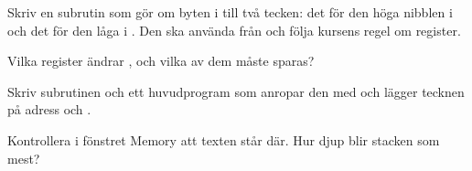 \label{c10:ex:13}
Skriv en subrutin  som gör om byten i  till två tecken: det för den
höga nibblen i  och det för den låga i . Den ska använda 
från  och följa kursens regel om register.
\begin{parts}
  \item Vilka register ändrar , och vilka av dem måste sparas?
  \item Skriv subrutinen och ett huvudprogram som anropar den med  och lägger tecknen på
    adress  och .
  \item Kontrollera i fönstret Memory att texten  står där. Hur djup blir stacken som mest?
\end{parts}
